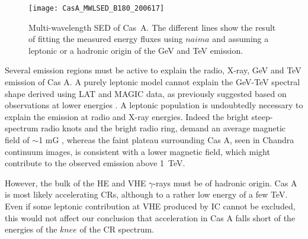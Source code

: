 \documentclass{PoS}
\begin{document}
\begin{figure}[t]
\centering
\texttt{[image: CasA\_MWLSED\_B180\_200617]}
\caption{Multi-wavelength SED of Cas~A. The different lines show the result of fitting the measured energy fluxes using $naima$ and assuming a leptonic or a hadronic origin of the GeV and TeV emission.}\label{fig:SEDModel}
\end{figure}



Several emission regions must be active to explain the radio, X-ray, GeV and TeV emission of Cas A. A purely leptonic model cannot explain the GeV-TeV spectral shape derived using LAT and MAGIC data, as previously suggested based on observations at lower energies 
\cite{Saha_2014,Zirakashvili_2014,Atoyan_2000_1, Atoyan_2000_2}. A leptonic population is undoubtedly necessary to explain the emission at radio and X-ray energies. Indeed the bright steep-spectrum radio knots and the bright radio ring, demand an average magnetic field of $\sim$1 mG \cite{Vink_2003}, whereas the faint plateau surrounding Cas A, seen in Chandra continuum images, is consistent with a lower magnetic field, which might contribute to the observed emission above 1~TeV. 

However, the bulk of the HE and VHE $\gamma$-rays must be of hadronic origin. Cas A is most likely accelerating CRs, although to a rather low energy of a few TeV. Even if some leptonic contribution at VHE produced by IC cannot be excluded, this would not affect our conclusion that acceleration in Cas A falls short of the energies of the $knee$ of the CR spectrum.



\end{document}
